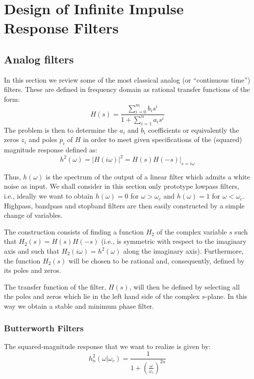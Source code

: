 \chapter[IIR Filters]{Design of Infinite Impulse Response Filters}
\label{iir}

\section{Analog filters}
In this section we review some of the most classical analog (or ``continuous time'') filters.
These are defined in frequency domain as rational transfer functions of the form:
$$H(s)=\displaystyle{ \frac{\sum_{i=0}^{m}{b_i s ^i}}{1+\sum_{i=1}^{n}{a_i s ^i}}}$$
The problem is then to determine the $a_i$ and $b_i$ coefficients or equivalently the zeros $z_i$ and poles $p_i$ of $H$ in order to meet given specifications of the (squared) magnitude response defined as: 
\begin{equation}
\label{hhh}
h^2(\omega)={\vert H(i\omega) \vert}^2={H(s)H(-s) \vert _{s=i\omega}}
\end{equation}

Thus, $h(\omega)$ is the spectrum of the output of a linear filter which admits a white noise as input.
We shall consider in this section only prototype lowpass filters, i.e., ideally we want to obtain $h(\omega) = 0$ for $\omega > \omega_c$ and $h(\omega) = 1$ for $\omega < \omega_c$.
Highpass, bandpass and stopband filters are then easily constructed by a simple change of variables.

The construction consists of finding a function $H_2$ of the complex variable $s$ such that $H_2(s) = H(s)H(-s)$ (i.e., 
is symmetric with respect to the imaginary axis and 
such that $H_2(i \omega) = h^2(\omega)$ along the imaginary axis).
Furthermore, the function $H_2(s)$ will be chosen to be rational and, 
consequently,  defined by its poles and zeros.

The transfer function of the filter, $H(s)$,  will then be 
defined by selecting all the poles and zeros which lie in the left hand
side of the complex $s$-plane.
In this way we obtain a stable and minimum phase filter.

\subsection{Butterworth Filters}
The squared-magnitude response that we want to realize is given by:
\begin{equation}
\label{real}
h_n^2(\omega \vert \omega_c)=\displaystyle{\frac{1}{1+\displaystyle{{(\frac{\omega}{ \omega_c})}^{2n}}}}
\end{equation}

